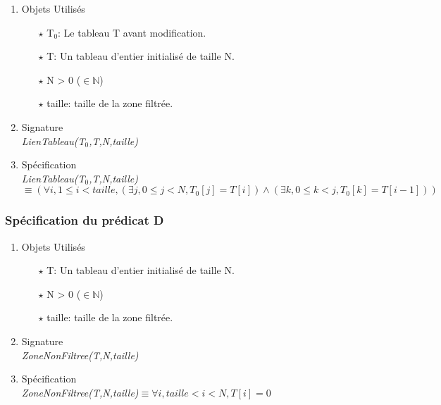 \documentclass[a4paper, 11pt, oneside]{article}
\begin{document}
        \begin{enumerate}
            \item Objets Utilisés
                \begin{itemize}
                    \item[$\star$] T$_0$: Le tableau T avant modification.
                    \item[$\star$] T: Un tableau d'entier initialisé de taille N.
                    \item[$\star$] N > 0 ($\in \mathbb{N}$)
                    \item[$\star$] taille: taille de la zone filtrée. 
                \end{itemize}

            \item Signature \\
                \textit{LienTableau(T$_0$,T,N,taille)}

            \item Spécification\\
                \textit{LienTableau(T$_0$,T,N,taille)}$\equiv (\forall i, 1\leq i < taille, (\exists j, 0\leq j < N, T_0[j] = T[i]) \wedge (\exists k, 0\leq k < j, T_0[k] = T[i-1]) )$
        \end{enumerate}

        \subsubsection{Spécification du prédicat D}

        \begin{enumerate}
            \item Objets Utilisés
                \begin{itemize}
                    \item[$\star$] T: Un tableau d'entier initialisé de taille N.
                    \item[$\star$] N > 0 ($\in \mathbb{N}$)
                    \item[$\star$] taille: taille de la zone filtrée. 
                \end{itemize}

            \item Signature \\
                \textit{ZoneNonFiltree(T,N,taille)}

            \item Spécification\\
                \textit{ZoneNonFiltree(T,N,taille)}$\equiv \forall i, taille < i < N, T[i]=0$
        \end{enumerate}
\end{document}
